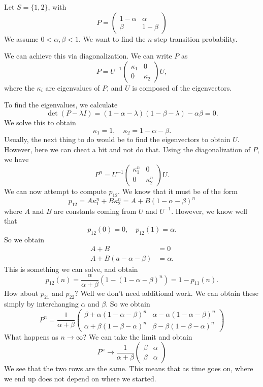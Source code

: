 \documentclass[a4paper]{article}
\begin{document}
\begin{eg}
  Let $S = \{1, 2\}$, with
  \[
    P =
    \begin{pmatrix}
      1 - \alpha & \alpha\\
      \beta & 1 - \beta
    \end{pmatrix}
  \]
  We assume $0 < \alpha, \beta < 1$. We want to find the $n$-step transition probability.

  We can achieve this via diagonalization. We can write $P$ as
  \[
    P = U^{-1}
    \begin{pmatrix}
      \kappa_1 & 0\\
      0 & \kappa_2
    \end{pmatrix}U,
  \]
  where the $\kappa_i$ are eigenvalues of $P$, and $U$ is composed of the eigenvectors.

  To find the eigenvalues, we calculate
  \[
    \det (P - \lambda I) = (1 - \alpha - \lambda)(1 - \beta - \lambda) - \alpha\beta = 0.
  \]
  We solve this to obtain
  \[
    \kappa_1 = 1,\quad \kappa_2 = 1 - \alpha - \beta.
  \]
  Usually, the next thing to do would be to find the eigenvectors to obtain $U$. However, here we can cheat a bit and not do that. Using the diagonalization of $P$, we have
  \[
    P^n = U^{-1}
    \begin{pmatrix}
      \kappa_1^n & 0\\
      0 & \kappa_2^n
    \end{pmatrix}U.
  \]
  We can now attempt to compute $p_{12}$. We know that it must be of the form
  \[
    p_{12} = A\kappa_1^n + B\kappa_2^n = A + B(1 - \alpha - \beta)^n
  \]
  where $A$ and $B$ are constants coming from $U$ and $U^{-1}$. However, we know well that
  \[
    p_{12}(0) = 0,\quad p_{12}(1) = \alpha.
  \]
  So we obtain
  \begin{align*}
    A + B &= 0\\
    A + B(a - \alpha - \beta) &= \alpha.
  \end{align*}
  This is something we can solve, and obtain
  \[
    p_{12}(n) = \frac{\alpha}{\alpha + \beta}(1 - (1 - \alpha - \beta)^n) = 1 - p_{11}(n).
  \]
  How about $p_{21}$ and $p_{22}$? Well we don't need additional work. We can obtain these simply by interchanging $\alpha$ and $\beta$. So we obtain
  \[
    P^n = \frac{1}{\alpha + \beta}
    \begin{pmatrix}
      \beta + \alpha(1 - \alpha - \beta)^n & \alpha - \alpha(1 - \alpha - \beta)^n\\
      \alpha + \beta(1 - \beta - \alpha)^n & \beta - \beta(1 - \beta - \alpha)^n
    \end{pmatrix}
  \]
  What happens as $n\to \infty$? We can take the limit and obtain
  \[
    P^n \to \frac{1}{\alpha + \beta}
    \begin{pmatrix}
      \beta & \alpha\\
      \beta & \alpha
    \end{pmatrix}
  \]
  We see that the two rows are the same. This means that as time goes on, where we end up does not depend on where we started.


\end{eg}
\end{document}
